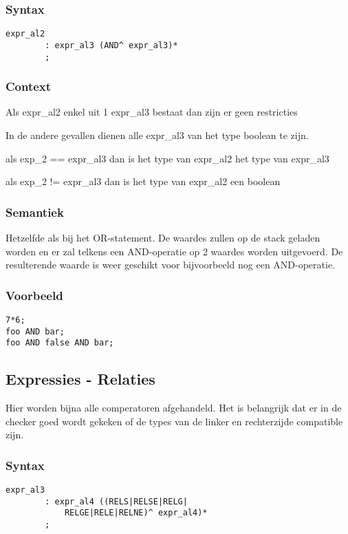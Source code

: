 \documentclass[]{article}
\begin{document}
\subsubsection{Syntax}
\begin{lstlisting}[style=ANTLR]
	expr_al2
		: expr_al3 (AND^ expr_al3)*
		;
\end{lstlisting}
\subsubsection{Context}
\begin{list}{•}{•}
\item Als expr\_al2 enkel uit 1 expr\_al3 bestaat dan zijn er geen restricties
\item In de andere gevallen dienen alle expr\_al3 van het type boolean te zijn.
\item als exp\_2 == expr\_al3 dan is het type van expr\_al2 het type van expr\_al3
\item als exp\_2 != expr\_al3 dan is het type van expr\_al2 een boolean
\end{list}
\subsubsection{Semantiek}
Hetzelfde als bij het OR-statement. De waardes zullen op de stack geladen worden en er zal telkens een AND-operatie op 2 waardes worden uitgevoerd. De resulterende waarde is weer geschikt voor bijvoorbeeld nog een AND-operatie.
\subsubsection{Voorbeeld}
\begin{lstlisting}[style=SELMA]
7*6;
foo AND bar;
foo AND false AND bar;
\end{lstlisting}

\subsection{Expressies - Relaties}
Hier worden bijna alle comperatoren afgehandeld. Het is belangrijk dat er in de checker goed wordt gekeken of de types van de linker en rechterzijde compatible zijn.
\subsubsection{Syntax}
\begin{lstlisting}[style=ANTLR]
	expr_al3
		: expr_al4 ((RELS|RELSE|RELG|
			RELGE|RELE|RELNE)^ expr_al4)*
		;
\end{lstlisting}
\end{document}
